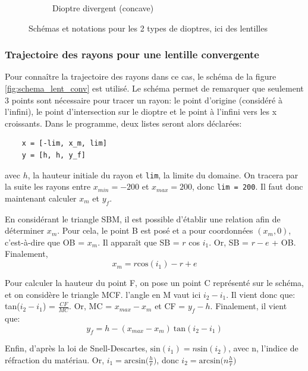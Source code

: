 \documentclass[a4paper, 11pt]{article}
\begin{document}
\begin{figure}[H]
\begin{subfigure}[t]{0.45\linewidth}
		\caption{Dioptre divergent (concave)}
		\label{fig:schema_lent_div} 
    \end{subfigure}

    \caption{Schémas et notations pour les 2 types de dioptres, ici des lentilles}\label{fig:schema_lentilles}
\end{figure}

\subsubsection{Trajectoire des rayons pour une lentille convergente}
Pour connaître la trajectoire des rayons dans ce cas, le schéma de la figure \ref{fig:schema_lent_conv} est utilisé. Le schéma permet de remarquer que seulement 3 points sont nécessaire pour tracer un rayon: le point d'origine (considéré à l'infini), le point d'intersection sur le dioptre et le point à l'infini vers les x croissants. Dans le programme, deux listes seront alors déclarées:
\begin{verbatim}
	x = [-lim, x_m, lim]
	y = [h, h, y_f]
\end{verbatim}
avec $h$, la hauteur initiale du rayon et \verb|lim|, la limite du domaine. On tracera par la suite les rayons entre $x_{min} = -200$ et $x_{max} = 200$, donc \verb|lim = 200|. Il faut donc maintenant calculer $x_m$ et $y_f$.


En considérant le triangle SBM, il est possible d'établir une relation afin de déterminer $x_m$. Pour cela, le point B est posé et a pour coordonnées $(x_m, 0)$, c'est-à-dire que OB = $x_m$. Il apparaît que SB = $r$ cos $i_1$. Or, SB = $r - e$ + OB. 
Finalement, 
\begin{equation*}
	x_m = r \text{cos}(i_1) - r + e
\end{equation*}

Pour calculer la hauteur du point F, on pose un point C représenté sur le schéma, et on considère le triangle MCF. l'angle en M vaut ici $i_2 - i_1$. Il vient donc que: tan($i_2 - i_1$) = $\frac{CF}{MC}$. Or, MC = $x_{max} - x_m$ et CF = $y_f - h$. Finalement, il vient que:
\begin{equation*}
	y_f = h - (x_{max} - x_m) \: \text{tan} (i_2 - i_1)
\end{equation*}


Enfin, d'après la loi de Snell-Descartes, $\text{sin}(i_1) = n \text{sin}(i_2)$, avec n, l'indice de réfraction du matériau. Or, $i_1 = \text{arcsin}\big( \frac{h}{r}\big)$, donc $i_2 = \text{arcsin}\big( n \frac{h}{r}\big)$
\end{document}
